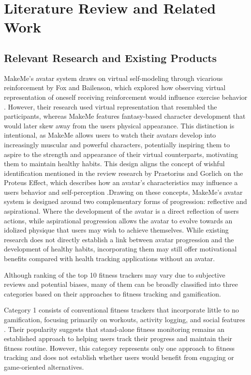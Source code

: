 \documentclass[11pt]{article}
\begin{document}
\section{Literature Review and Related Work}

\subsection{Relevant Research and Existing Products}
MakeMe’s avatar system draws on virtual self-modeling through vicarious reinforcement by Fox
and Bailenson, which explored how observing virtual representation of oneself receiving reinforcement
would influence exercise behavior \cite{fox2009VRS}. However, their research used virtual representation that
resembled the participants, whereas MakeMe features fantasy-based character development that would
later skew away from the users physical appearance. This distinction is intentional, as MakeMe allows
users to watch their avatars develop into increasingly muscular and powerful characters, potentially
inspiring them to aspire to the strength and appearance of their virtual counterparts, motivating them
to maintain healthy habits. This design aligns the concept of wishful identification mentioned in the
review research by Praetorius and Gorlich on the Proteus Effect, which describes how an avatar's characteristics
may influence a users behavior and self-perception \cite{praetorius2020avatars}.Drawing on these concepts, MakeMe’s
avatar system is designed around two complementary forms of progression: reflective and aspirational. Where the development
of the avatar is a direct reflection of users actions, while aspirational progression allows the avatar to evolve towards
an idolized physique that users may wish to achieve themselves. While existing research does not directly establish
a link between avatar progression and the development of healthy habits, incorporating them may still offer
motivational benefits compared with health tracking applications without an avatar.

Although ranking of the top 10 fitness trackers may vary due to subjective
reviews and potential biases, many of them can be broadly classified into three categories based on their approaches
to fitness tracking and gamification.

Category 1 consists of conventional fitness trackers that incorporate little to no gamification,
focusing primarily on workouts, activity logging, and social features \cite{hall2026bestfitnessapps, herman2026bestfitnessapps}. Their
popularity suggests that stand-alone fitness monitoring remains an established approach to helping users
track their progress and maintain their fitness routine. However, this category represents only one approach
to fitness tracking and does not establish whether users would benefit from engaging or game-oriented alternatives.
\end{document}
